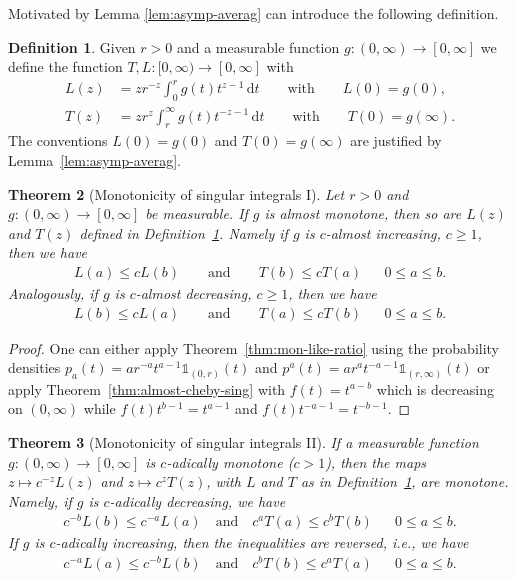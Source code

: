 \documentclass[12pt, reqno]{amsart}%
\theoremstyle{plain}  %
\newtheorem{theorem}{Theorem}[section]
\theoremstyle{definition}  %
\newtheorem{definition}[theorem]{Definition}
\theoremstyle{remark}
\numberwithin{equation}{section}
\renewcommand{\d}{\,\mathrm{d}}
\begin{document}
Motivated by Lemma \ref{lem:asymp-averag} can introduce  the following definition.
\begin{definition}\label{def:tail-sing-int}
Given  $r>0$ and a measurable function $g: (0,\infty)\to [0,\infty]$ we define the function $T,L: [0,\infty) \to[0,\infty]$ with
\begin{align*}
L(z)&= zr^{-z}\int_0^r  g(t)t^{z-1} \d t\qquad\text{with}\qquad L(0)= g(0), \\
T(z)&= zr^{z} \int_r^\infty g(t) t^{-z-1} \d t\qquad\text{with}\qquad T(0)=g(\infty).
\end{align*}
The conventions $L(0) = g(0)$ and $T(0) = g(\infty)$ are justified by Lemma~\ref{lem:asymp-averag}.
\end{definition}

\begin{theorem}[Monotonicity of singular integrals I]
\label{thm:almost-monotone}
Let $r>0$ and $g: (0,\infty)\to [0,\infty]$ be measurable. If $g$ is almost monotone, then so are $L(z)$ and $T(z)$ defined in Definition~\ref{def:tail-sing-int}.  Namely if $g$ is $c$-almost increasing, $c \geq 1$, then we have
\begin{align*}
L(a)\leq cL(b)\qquad \text{and}\qquad T(b)\leq cT(a) && 0\leq a\leq b.
\end{align*}
Analogously, if $g$ is $c$-almost decreasing, $c \ge 1$, then we have
\begin{align*}
L(b)\leq cL(a)\qquad \text{and}\qquad T(a)\leq cT(b)&& 0\leq a\leq b.
\end{align*}
\end{theorem}

\begin{proof}
One can either apply Theorem~\ref{thm:mon-like-ratio} using the probability densities $p_a(t)= ar^{-a} t^{a-1}\mathds{1}_{(0,r)}(t)$ and $p^a(t)= ar^{a} t^{-a-1}\mathds{1}_{(r,\infty)}(t)$ or  apply Theorem~\ref{thm:almost-cheby-sing} with $f(t)=t^{a-b}$ which is decreasing on $(0,\infty)$
while $ f(t) t^{b-1}=  t^{a-1}$ and $ f(t) t^{-a-1}=  t^{-b-1}$.
\end{proof}
\begin{theorem}[Monotonicity of singular integrals II]\label{thm:cadic-monotonicity}
If a measurable function $g: (0,\infty)\to [0,\infty]$ is $c$-adically monotone ($c>1$), then the maps $z\mapsto c^{-z}L(z)$ and $z\mapsto c^zT(z)$, with $L$ and $T$ as in Definition~\ref{def:tail-sing-int}, are monotone. Namely, if  $g$ is $c$-adically decreasing, we have
\begin{align*}
c^{-b}L(b)\leq c^{-a}L(a)\quad \text{and}\quad  c^{a}T(a)\leq c^{b}T(b)&&0\leq a\leq b.
\end{align*}
If $g$ is $c$-adically increasing, then the inequalities are reversed, i.e., we have
\begin{align*}
c^{-a}L(a)\leq c^{-b}L(b)\quad \text{and}\quad c^{b}T(b)\leq c^{a}T(a)&&0\leq a\leq b.
\end{align*}
\end{theorem}
\end{document}
